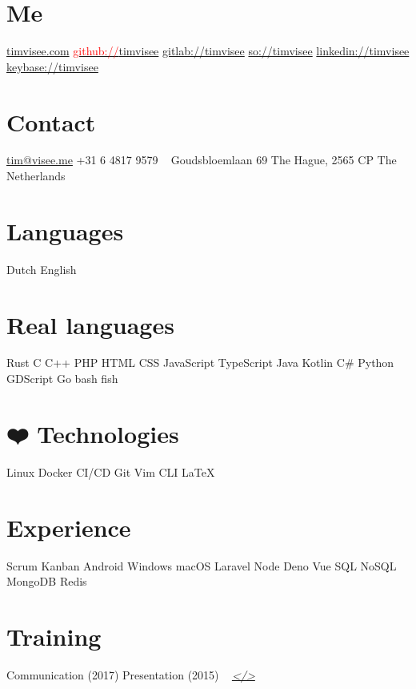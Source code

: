 \documentclass[]{cv-timvisee}
\begin{document}


\begin{aside}
\section{Me}
\href{https://timvisee.com/}{timvisee.com}
\href{https://github.com/timvisee}{\textcolor{red}{github://}timvisee}
\href{https://gitlab.com/timvisee}{gitlab://timvisee}
\href{https://stackoverflow.com/users/1000145}{so://timvisee}
\href{https://linkedin.com/in/timvisee}{linkedin://timvisee}
\href{https://keybase.io/timvisee}{keybase://timvisee}
\section{Contact}
\href{mailto:tim@visee.me}{tim@visee.me}
+31 6 4817 9579
~
Goudsbloemlaan 69
The Hague, 2565 CP
The Netherlands
\section{Languages}
Dutch \textperiodcentered{} English
\section{Real languages}
Rust \textperiodcentered{} C \textperiodcentered{} C++
PHP \textperiodcentered{} HTML \textperiodcentered{} CSS
JavaScript \textperiodcentered{} TypeScript
Java \textperiodcentered{} Kotlin \textperiodcentered{} C\#
Python \textperiodcentered{} GDScript \textperiodcentered{} Go
bash \textperiodcentered{} fish
\section{{\DejaSans ❤️} Technologies}
Linux \textperiodcentered{} Docker \textperiodcentered{} CI/CD
Git \textperiodcentered{} Vim \textperiodcentered{} CLI \textperiodcentered{} \LaTeX{}
\section{Experience}
Scrum \textperiodcentered{} Kanban
Android \textperiodcentered{} Windows \textperiodcentered{} macOS
Laravel \textperiodcentered{} Node \textperiodcentered{} Deno \textperiodcentered{} Vue
SQL \textperiodcentered{} NoSQL
MongoDB \textperiodcentered{} Redis
\section{Training}
Communication (2017)
Presentation (2015)
~
\textit{\href{https://github.com/timvisee/cv}{</>}}
\end{aside}
\end{document}
